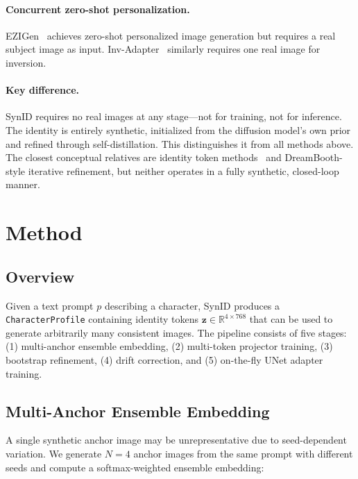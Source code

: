 \documentclass[10pt,twocolumn]{article}
\begin{document}
\paragraph{Concurrent zero-shot personalization.}
EZIGen~\cite{zhang2024ezigen} achieves zero-shot personalized image generation but requires a real subject image as input. Inv-Adapter~\cite{hong2024invadapter} similarly requires one real image for inversion.

\paragraph{Key difference.}
SynID requires no real images at any stage---not for training, not for inference. The identity is entirely synthetic, initialized from the diffusion model's own prior and refined through self-distillation. This distinguishes it from all methods above. The closest conceptual relatives are identity token methods~\cite{chen2023identitytokens} and DreamBooth-style iterative refinement, but neither operates in a fully synthetic, closed-loop manner.

\section{Method}

\subsection{Overview}

Given a text prompt $p$ describing a character, SynID produces a \texttt{CharacterProfile} containing identity tokens $\mathbf{z} \in \mathbb{R}^{4 \times 768}$ that can be used to generate arbitrarily many consistent images. The pipeline consists of five stages: (1) multi-anchor ensemble embedding, (2) multi-token projector training, (3) bootstrap refinement, (4) drift correction, and (5) on-the-fly UNet adapter training.

\subsection{Multi-Anchor Ensemble Embedding}

A single synthetic anchor image may be unrepresentative due to seed-dependent variation. We generate $N=4$ anchor images from the same prompt with different seeds and compute a softmax-weighted ensemble embedding:
\end{document}
